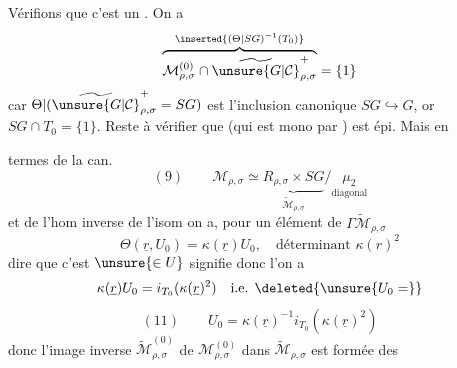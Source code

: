Vérifions que c'est un .
On a
\[
\overbrace{\mathcal M_{\rho,\sigma}^{(0)}\cap\widetilde{\unsure{G|\mathcal C}}_{\rho,\sigma}^{+}}
^{\inserted{(\Theta|SG)^{-1}(T_0)}}=\{1\}
\]
car $\Theta|(\widetilde{\unsure{G|\mathcal C}}_{\rho,\sigma}^{+}=SG)$ est l'inclusion
canonique $SG\hookrightarrow G$, or $SG\cap T_0=\{1\}$.
Reste à vérifier que
(qui est mono par ) est épi. Mais en



termes de la  can.
\[
(9)\qquad\mathcal M_{\rho,\sigma}\simeq
\underbrace{R_{\rho,\sigma}\times SG}_{\widetilde{\mathcal M}_{\rho,\sigma}}
/\underset{\text{diagonal}}{\mu_2}
\]
et de l'hom
 inverse de l'isom
on a, pour un élément
de $\Gamma\widetilde{\mathcal M}_{\rho,\sigma}$
\[
\Theta(\underline r,U_0)=\kappa(\underline r)U_0,\quad
\text{déterminant }\kappa(r)^2
\]
dire que c'est $\unsure{\in U}$ signifie donc l'on a
\[
\kappa(\underline r)U_0=i_{T_0}(\kappa(\underline r)^2)
\quad\text{i.e. }\deleted{\unsure{U_0=}}
\]
\[
(11)\qquad U_0=\kappa(\underline r)^{-1}i_{T_0}(\kappa(\underline r)^2)
\]
donc l'image inverse $\widetilde{\mathcal M}_{\rho,\sigma}^{(0)}$ de
$\mathcal M_{\rho,\sigma}^{(0)}$ dans $\widetilde{\mathcal M}_{\rho,\sigma}$ est formée des
